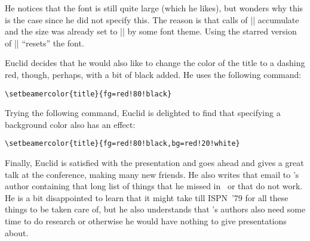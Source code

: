 He notices that the font is still quite large (which he likes), but wonders why this is the case since he did not specify this. The reason is that calls of |\setbeamerfont| accumulate and the size was already set to |\large| by some font theme. Using the starred version of |\setbeamerfont| ``resets'' the font.

Euclid decides that he would also like to change the color of the title to a dashing red, though, perhaps, with a bit of black added. He uses the following command:
\begin{verbatim}
\setbeamercolor{title}{fg=red!80!black}
\end{verbatim}
Trying the following command, Euclid is delighted to find that specifying a background color also has an effect:
\begin{verbatim}
\setbeamercolor{title}{fg=red!80!black,bg=red!20!white}
\end{verbatim}

Finally, Euclid is satisfied with the presentation and goes ahead and gives a great talk at the conference, making many new friends. He also writes that email to \beamer's author containing that long list of things that he missed in \beamer\ or that do not work. He is a bit disappointed to learn that it might take till ISPN~'79 for all these things to be taken care of, but he also understands that \beamer's authors also need some time to do research or otherwise he would have nothing to give presentations about.
